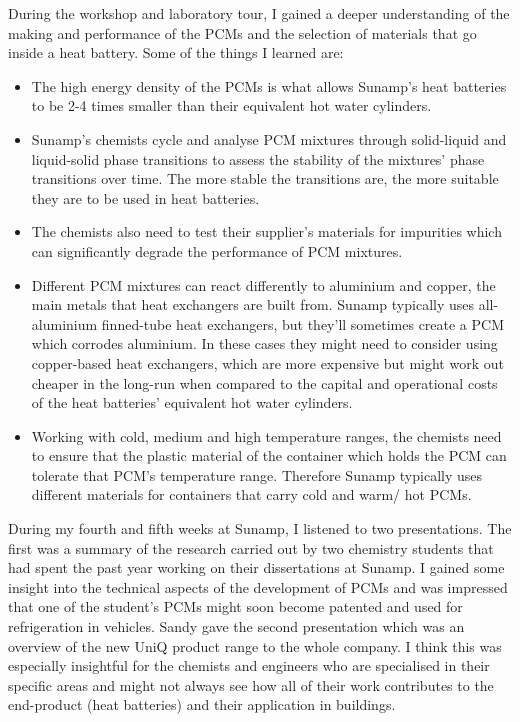 During the workshop and laboratory tour, I gained a deeper understanding of the making and performance of the PCMs and the selection of materials that go inside a heat battery.
Some of the things I learned are:
\begin{itemize}
    \item The high energy density of the PCMs is what allows Sunamp's heat batteries to be 2-4 times smaller than their equivalent hot water cylinders.
    \item Sunamp's chemists cycle and analyse PCM mixtures through solid-liquid and liquid-solid phase transitions to assess the stability of the mixtures' phase transitions over time. The more stable the transitions are, the more suitable they are to be used in heat batteries.
    \item The chemists also need to test their supplier's materials for impurities which can significantly degrade the performance of PCM mixtures.
    \item Different PCM mixtures can react differently to aluminium and copper, the main metals that heat exchangers are built from. Sunamp typically uses all-aluminium finned-tube heat exchangers, but they'll sometimes create a PCM which corrodes aluminium. In these cases they might need to consider using copper-based heat exchangers, which are more expensive but might work out cheaper in the long-run when compared to the capital and operational costs of the heat batteries' equivalent hot water cylinders.
    \item Working with cold, medium and high temperature ranges, the chemists need to ensure that the plastic material of the container which holds the PCM can tolerate that PCM's temperature range. Therefore Sunamp typically uses different materials for containers that carry cold and warm/ hot PCMs.
\end{itemize}

During my fourth and fifth weeks at Sunamp, I listened to two presentations.
The first was a summary of the research carried out by two chemistry students that had spent the past year working on their dissertations at Sunamp.
I gained some insight into the technical aspects of the development of PCMs and was impressed that one of the student's PCMs might soon become patented and used for refrigeration in vehicles.
Sandy gave the second presentation which was an overview of the new UniQ product range to the whole company.
I think this was especially insightful for the chemists and engineers who are specialised in their specific areas and might not always see how all of their work contributes to the end-product (heat batteries) and their application in buildings.


